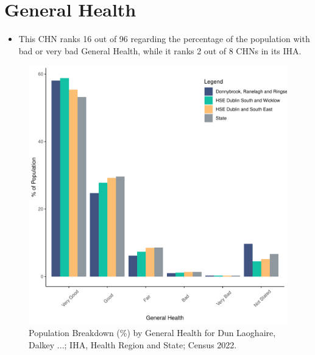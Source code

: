 \documentclass{article}
\begin{document}
\pagebreak

\section{General Health}\label{sect:GenHealth}
\begin{itemize}
\item  This CHN ranks  16 out of 96 regarding the percentage of the population with bad or very bad General Health, while it ranks   2 out of 8 CHNs in its IHA.
\end{itemize}
\begin{figure}[h]
	\centering
	\includegraphics[width = 150mm]{../figures/GenED.pdf}
	\caption{Population Breakdown (\%) by General Health for Dun Laoghaire, Dalkey ...; IHA, Health Region and State;  Census 2022.}
	\label{fig:2ae19629-1a6a-13a3-e055-000000000001}
	\end{figure}
\end{document}
